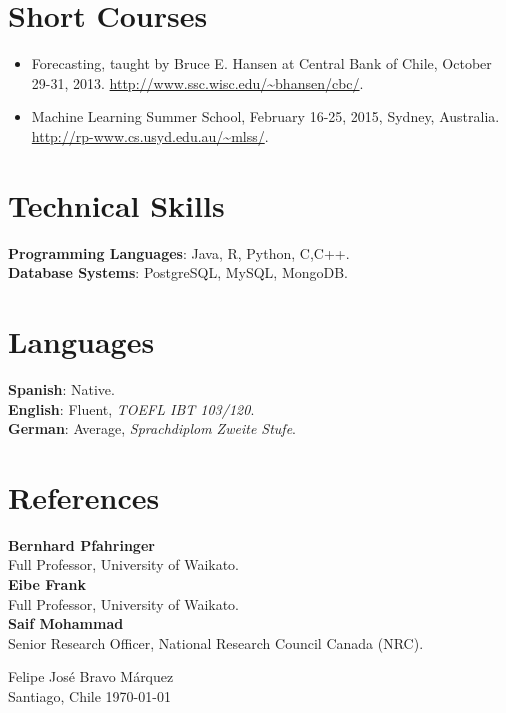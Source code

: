 \documentclass[letterpaper]{article}
\begin{document}
  
  
\section{Short Courses}
\begin{itemize}
 \item Forecasting, taught by Bruce E. Hansen at Central Bank of Chile, October 29-31, 2013. \url{http://www.ssc.wisc.edu/~bhansen/cbc/}.
 \item Machine Learning Summer School, February 16-25, 2015, Sydney, Australia. \url{http://rp-www.cs.usyd.edu.au/~mlss/}.
 \end{itemize} 
 
 
 
 
 

\section{Technical Skills}
\begin{flushleft}
\textbf{Programming Languages}: Java, R, Python, C,C++. \\
\textbf{Database Systems}: PostgreSQL, MySQL, MongoDB.\\
\end{flushleft}

\section{Languages}
\begin{flushleft}
\textbf{Spanish}: Native.  \\
\textbf{English}: Fluent, \textit{TOEFL IBT 103/120}.   \\
\textbf{German}:  Average, \textit{Sprachdiplom Zweite Stufe}. \\ 
\end{flushleft}

\section{References}
\begin{flushleft}
\textbf{Bernhard Pfahringer} \\
Full Professor, University of Waikato. \\
\textbf{Eibe Frank} \\
Full Professor, University of Waikato. \\
\textbf{Saif Mohammad}   \\
Senior Research Officer, National Research Council Canada (NRC). \\ 
\end{flushleft}


\vspace{\baselineskip}
\begin{flushright}
Felipe José Bravo Márquez\\
Santiago, Chile \today
\end{flushright}
\end{document}
